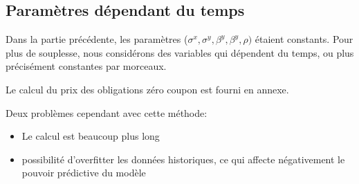 \subsection{ Paramètres dépendant du temps}

Dans la partie précédente, les paramètres ($\sigma^x, \sigma^y, \beta^y, \beta^y, \rho)$ étaient constants. Pour plus de souplesse, nous considérons des variables qui dépendent  du temps, ou plus précisément constantes par morceaux.

Le calcul du prix des obligations zéro coupon est fourni en annexe.

Deux problèmes cependant avec cette méthode:

\begin{itemize}
\item Le calcul est beaucoup plus long
\item possibilité d'overfitter les données historiques, ce qui affecte négativement le pouvoir prédictive du modèle
\end{itemize}



